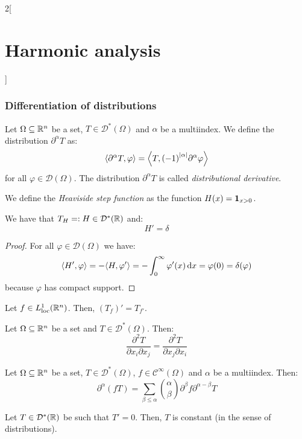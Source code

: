 \documentclass[../../../main_math.tex]{subfiles}
\begin{document}
\begin{multicols}{2}[\section{Harmonic analysis}]
  \subsubsection{Differentiation of distributions}
  \begin{definition}
    Let $\Omega\subseteq \mathbb{R}^n$ be a set, $T\in\mathcal{D}^*(\Omega)$ and $\alpha$ be a multiindex. We define the distribution $\partial^\alpha T$ as: $${\left\langle\partial^\alpha T,\varphi\right\rangle}={\left\langle T,{(-1)}^\abs{\alpha}\partial^\alpha\varphi\right\rangle}$$
    for all $\varphi\in\mathcal{D}(\Omega)$. The distribution $\partial^\alpha T$ is called \emph{distributional derivative}.
  \end{definition}
  \begin{definition}
    We define the \emph{Heaviside step function} as the function $H(x)=\boldsymbol{\mathrm{1}}_{x>0}$.
  \end{definition}
  \begin{proposition}
    We have that $T_{H}=:H\in\mathcal{D}^*(\mathbb{R})$ and: $$H'=\delta$$
  \end{proposition}
  \begin{proof}
    For all $\varphi\in\mathcal{D}(\Omega)$ we have:
    \begin{equation*}
      {\left\langle H',\varphi\right\rangle}=-{\left\langle H,\varphi'\right\rangle} =-\int_{0}^\infty\varphi'(x)\dd{x}= \varphi(0)=\delta(\varphi)
    \end{equation*}
    because $\varphi$ has compact support.
  \end{proof}
  \begin{lemma}
    Let $f\in L_{\text{loc}}^1(\mathbb{R}^n)$. Then, ${(T_f)}'=T_{f'}$.
  \end{lemma}
  \begin{proposition}
    Let $\Omega\subseteq \mathbb{R}^n$ be a set and $T\in\mathcal{D}^*(\Omega)$. Then:
    $$
      \frac{\partial^2 T}{\partial x_i\partial x_j}=\frac{\partial^2 T}{\partial x_j\partial x_i}
    $$
  \end{proposition}
  \begin{proposition}
    Let $\Omega\subseteq \mathbb{R}^n$ be a set, $T\in\mathcal{D}^*(\Omega)$, $f\in \mathcal{C}^\infty(\Omega)$ and $\alpha$ be a multiindex. Then:
    $$
      \partial^\alpha (fT)=\sum_{\beta\leq \alpha}\binom{\alpha}{\beta}\partial^\beta f\partial^{\alpha-\beta} T
    $$
  \end{proposition}
  \begin{proposition}
    Let $T\in \mathcal{D}^*(\mathbb{R})$ be such that $T'=0$. Then, $T$ is constant (in the sense of distributions).

\end{proposition}
\end{multicols}
\end{document}
